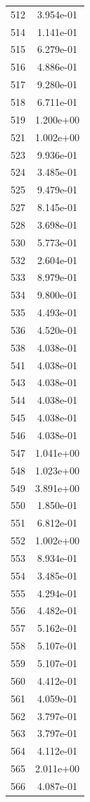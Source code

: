 \documentclass[12pt]{article}
\begin{document}
\begin{longtable}{@{}cc@{}}
512 & 3.954e-01 \\
514 & 1.141e-01 \\
515 & 6.279e-01 \\
516 & 4.886e-01 \\
517 & 9.280e-01 \\
518 & 6.711e-01 \\
519 & 1.200e+00 \\
521 & 1.002e+00 \\
523 & 9.936e-01 \\
524 & 3.485e-01 \\
525 & 9.479e-01 \\
527 & 8.145e-01 \\
528 & 3.698e-01 \\
530 & 5.773e-01 \\
532 & 2.604e-01 \\
533 & 8.979e-01 \\
534 & 9.800e-01 \\
535 & 4.493e-01 \\
536 & 4.520e-01 \\
538 & 4.038e-01 \\
541 & 4.038e-01 \\
543 & 4.038e-01 \\
544 & 4.038e-01 \\
545 & 4.038e-01 \\
546 & 4.038e-01 \\
547 & 1.041e+00 \\
548 & 1.023e+00 \\
549 & 3.891e+00 \\
550 & 1.850e-01 \\
551 & 6.812e-01 \\
552 & 1.002e+00 \\
553 & 8.934e-01 \\
554 & 3.485e-01 \\
555 & 4.294e-01 \\
556 & 4.482e-01 \\
557 & 5.162e-01 \\
558 & 5.107e-01 \\
559 & 5.107e-01 \\
560 & 4.412e-01 \\
561 & 4.059e-01 \\
562 & 3.797e-01 \\
563 & 3.797e-01 \\
564 & 4.112e-01 \\
565 & 2.011e+00 \\
566 & 4.087e-01 \\

\end{longtable}
\end{document}

